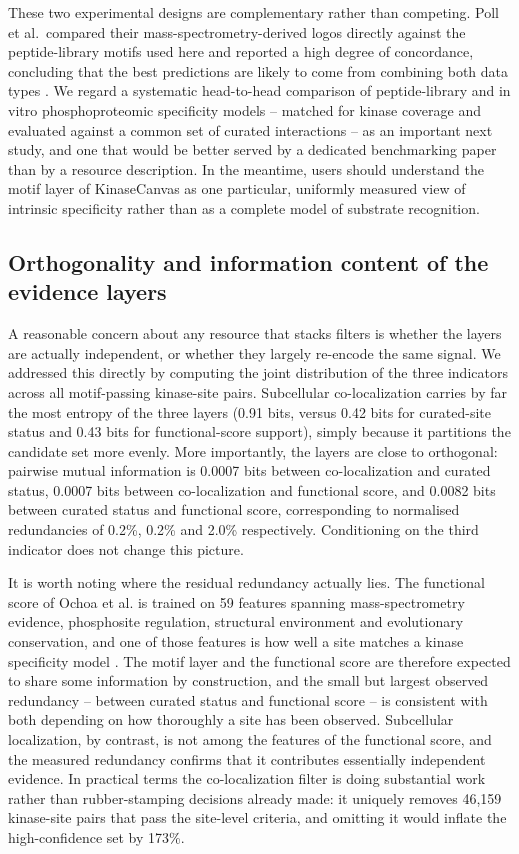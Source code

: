 \documentclass[
  number,
  preprint,
  onecolumn]{elsarticle}
\begin{document}
These two experimental designs are complementary rather than competing.
Poll et al.~compared their mass-spectrometry-derived logos directly
against the peptide-library motifs used here and reported a high degree
of concordance, concluding that the best predictions are likely to come
from combining both data types \citep{Poll2024-km}. We regard a
systematic head-to-head comparison of peptide-library and in vitro
phosphoproteomic specificity models -- matched for kinase coverage and
evaluated against a common set of curated interactions -- as an
important next study, and one that would be better served by a dedicated
benchmarking paper than by a resource description. In the meantime,
users should understand the motif layer of KinaseCanvas as one
particular, uniformly measured view of intrinsic specificity rather than
as a complete model of substrate recognition.

\subsection{Orthogonality and information content of the evidence
layers}\label{orthogonality-and-information-content-of-the-evidence-layers}

A reasonable concern about any resource that stacks filters is whether
the layers are actually independent, or whether they largely re-encode
the same signal. We addressed this directly by computing the joint
distribution of the three indicators across all motif-passing
kinase-site pairs. Subcellular co-localization carries by far the most
entropy of the three layers (0.91 bits, versus 0.42 bits for
curated-site status and 0.43 bits for functional-score support), simply
because it partitions the candidate set more evenly. More importantly,
the layers are close to orthogonal: pairwise mutual information is
0.0007 bits between co-localization and curated status, 0.0007 bits
between co-localization and functional score, and 0.0082 bits between
curated status and functional score, corresponding to normalised
redundancies of 0.2\%, 0.2\% and 2.0\% respectively. Conditioning on the
third indicator does not change this picture.

It is worth noting where the residual redundancy actually lies. The
functional score of Ochoa et al. is trained on 59 features spanning
mass-spectrometry evidence, phosphosite regulation, structural
environment and evolutionary conservation, and one of those features is
how well a site matches a kinase specificity model \citep{Ochoa2020-og}.
The motif layer and the functional score are therefore expected to share
some information by construction, and the small but largest observed
redundancy -- between curated status and functional score -- is
consistent with both depending on how thoroughly a site has been
observed. Subcellular localization, by contrast, is not among the
features of the functional score, and the measured redundancy confirms
that it contributes essentially independent evidence. In practical terms
the co-localization filter is doing substantial work rather than
rubber-stamping decisions already made: it uniquely removes 46,159
kinase-site pairs that pass the site-level criteria, and omitting it
would inflate the high-confidence set by 173\%.
\end{document}
